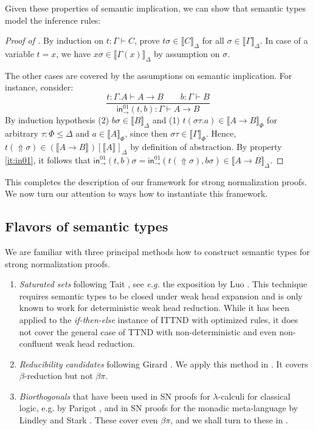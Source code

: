 \documentclass[a4paper,USenglish,cleveref, autoref, thm-restate]{lipics-v2021}
\newcommand{\eg}{\emph{e.g.}\xspace}
\newcommand{\den}[2][]{\llbracket#2\rrbracket^{#1}}
\newcommand{\ru}{\dfrac}
\newcommand{\Den}[2]{\den{#1}_{#2}}
\newcommand{\Gs}{\ensuremath{\sigma}}
\newcommand{\tin}{\ensuremath{\mathsf{in}}}
\newcommand{\inn}[2]{\ensuremath{\tin_{#1}^{#2}}}
\newcommand{\Up}{\mathop{\Uparrow}}
\begin{document}
Given these properties of semantic implication, we can show that
semantic types model the inference rules:

\begin{proof}[Proof of ]
  By induction on $t : \Gamma \vdash C$, prove $t\Gs \in \Den C \Delta$ for
  all $\Gs \in \Den \Gamma \Delta$.
  In case of a variable $t = x$, we have
  $x\Gs \in \Den{\Gamma(x)}\Delta$ by assumption on $\Gs$.

  The other cases are covered by the assumptions on semantic
  implication.  For instance, consider:
  \[
  \ru{t : \Gamma.A \vdash A \to B \qquad
      b : \Gamma \vdash B
    }{\inn\to{01}(t,b) : \Gamma \vdash A \to B
    }
  \]
  By induction hypothesis (2) $b\sigma \in \Den B \Delta$ and
  (1) $t(\sigma\tau.a) \in \Den{A \to B}\Phi$
  for arbitrary $\tau : \Phi \leq \Delta$ and $a \in \Den A \Phi$,
  since then $\sigma\tau \in \Den\Gamma\Phi$.
  Hence,
  $t(\Up\sigma) \in (\den{A \to B})[\den A]_\Delta$
  by definition of abstraction.
  By property \ref{it:in01}, it follows that
  $\inn\to{01}(t,b)\sigma = \inn\to{01}(t(\Up\sigma),b\sigma) \in \Den{A \to B}\Delta$.
\end{proof}

This completes the description of our framework for strong normalization proofs.
We now turn our attention to ways how to instantiate this framework.

\subsection{Flavors of semantic types}
\label{sec:flavors}

We are familiar with three principal methods how to construct semantic types for
strong normalization proofs.
\begin{enumerate}

\item \emph{Saturated sets} following Tait
  \cite{tait:functionalsFiniteTypeI}, see \eg the exposition by Luo
  \cite{luo:thesis}.
  This technique requires semantic types to be closed under weak head
  expansion and is only known to work for deterministic weak head
  reduction.
  While it has been applied \cite{geuversHurkens:icla17} to the
  \emph{if-then-else} instance of ITTND with optimized rules,
  it does not cover the general case of TTND with
  non-deterministic and even non-confluent weak head reduction.

\item \emph{Reducibility candidates} following Girard
  \cite{girard:thesis,girardLafontTaylor:proofsAndTypes}.  We apply
  this method in .
  It covers $\beta$-reduction but not $\beta\pi$.

\item \emph{Biorthogonals} that have been used in SN proofs for
  $\lambda$-calculi for classical logic, e.g. by Parigot \cite{parigot:jsl97},
  and in SN proofs for the monadic meta-language by Lindley and Stark
  \cite{lindleyStark:tlca05}.
  These cover even $\beta\pi$, and we shall turn to these in .
\end{enumerate}
\end{document}

